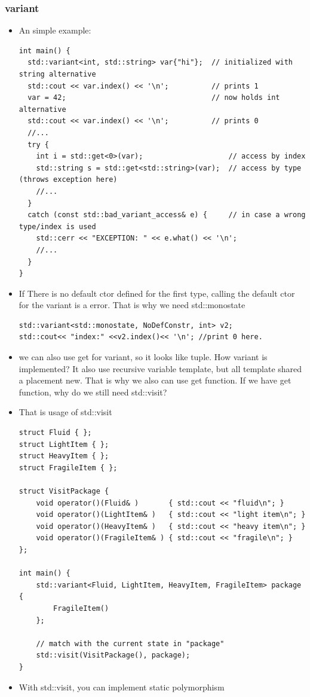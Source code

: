 \documentclass[a4paper,11pt,twoside]{book}
\begin{document}
\subsubsection{variant}
\begin{itemize}
\item An simple example:
\begin{lstlisting}
int main() {
  std::variant<int, std::string> var{"hi"};  // initialized with string alternative
  std::cout << var.index() << '\n';          // prints 1
  var = 42;                                  // now holds int alternative
  std::cout << var.index() << '\n';          // prints 0
  //...
  try {
    int i = std::get<0>(var);                    // access by index
    std::string s = std::get<std::string>(var);  // access by type (throws exception here)
    //...
  }
  catch (const std::bad_variant_access& e) {     // in case a wrong type/index is used
    std::cerr << "EXCEPTION: " << e.what() << '\n';
    //...
  }
}
\end{lstlisting}
\item If There is no default ctor defined for the first type, calling the default ctor for the variant is a error. That is why we need std::monostate
\begin{lstlisting}
std::variant<std::monostate, NoDefConstr, int> v2;
std::cout<< "index:" <<v2.index()<< '\n'; //print 0 here.
\end{lstlisting}
\item we can also use get for variant, so it looks like tuple. How variant is implemented? It also use recursive variable template, but all template shared a placement new. That is why we also can use get function. If we have get function, why do we still need std::visit?

\item That is usage of std::visit
\begin{lstlisting}
struct Fluid { };
struct LightItem { };
struct HeavyItem { };
struct FragileItem { };

struct VisitPackage {
    void operator()(Fluid& )       { std::cout << "fluid\n"; }
    void operator()(LightItem& )   { std::cout << "light item\n"; }
    void operator()(HeavyItem& )   { std::cout << "heavy item\n"; }
    void operator()(FragileItem& ) { std::cout << "fragile\n"; }
};

int main() {
    std::variant<Fluid, LightItem, HeavyItem, FragileItem> package { 
        FragileItem()
    };
    
    // match with the current state in "package"
    std::visit(VisitPackage(), package);
}
\end{lstlisting}
\item With std::visit, you can implement static polymorphism
\begin{lstlisting}


\end{lstlisting}
\end{itemize}
\end{document}
